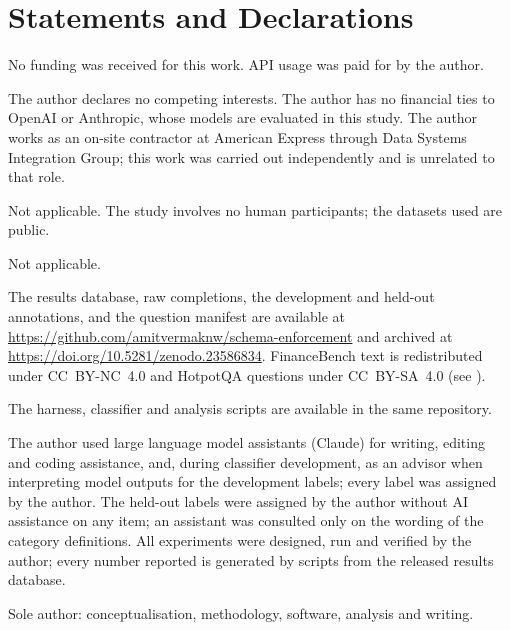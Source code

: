 \section*{Statements and Declarations}
\label{sec:declarations}

 No funding was received for this work. API usage was
paid for by the author.

 The author declares no competing interests.
The author has no financial ties to OpenAI or Anthropic, whose models are
evaluated in this study. The author works as an on-site contractor at
American Express through Data Systems Integration Group; this work was
carried out independently and is unrelated to that role.

 Not applicable. The study involves no human
participants; the datasets used are public.

 Not applicable.

 The results database, raw completions, the
development and held-out annotations, and the question manifest are
available at \url{https://github.com/amitvermaknw/schema-enforcement} and
archived at \url{https://doi.org/10.5281/zenodo.23586834}.
FinanceBench text is redistributed under CC~BY-NC~4.0 and HotpotQA
questions under CC~BY-SA~4.0 (see ).

 The harness, classifier and analysis scripts
are available in the same repository.

The author used large language model assistants (Claude) for writing,
editing and coding assistance, and, during classifier development, as an
advisor when interpreting model outputs for the development labels;
every label was assigned by the author. The held-out labels were assigned
by the author without AI assistance on any item; an assistant was
consulted only on the wording of the category definitions. All
experiments were designed, run and verified by the author; every number
reported is generated by scripts from the released results database.

 Sole author: conceptualisation,
methodology, software, analysis and writing.